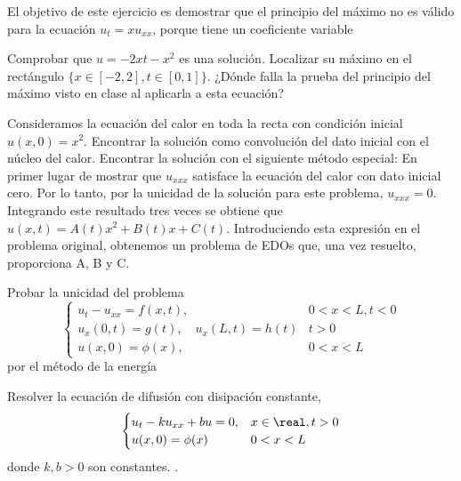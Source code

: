 \begin{problem}[13] El objetivo de este ejercicio es demostrar que el principio del máximo no es válido para la ecuación $ u_t=xu_{xx} $, porque tiene un coeficiente variable
	
\ppart Comprobar que $ u = -2xt - x^2 $ es una solución. Localizar su máximo en el rectángulo $ \{ x\in [-2,2], t\in [0,1] \} $.
\ppart ¿Dónde falla la prueba del principio del máximo visto en clase al aplicarla a esta ecuación?
	


\solution

\end{problem}





\begin{problem}[14] Consideramos la ecuación del calor en toda la recta con condición inicial $ u(x,0)=x^2 $.
\ppart Encontrar la solución como convolución del dato inicial con el núcleo del calor.
\ppart Encontrar la solución con el siguiente método especial: En primer lugar de mostrar que $ u_{xxx} $ satisface la ecuación del calor con dato inicial cero. Por lo tanto, por la unicidad de la solución para este problema, $ u_{xxx}=0 $. Integrando este resultado tres veces se obtiene que $ u(x,t)=A(t)x^2+B(t)x+C(t)$. Introduciendo esta expresión en el problema original, obtenemos un problema de EDOs que, una vez resuelto, proporciona A, B y C.

\solution

\end{problem}





\begin{problem}[15] Probar la unicidad del problema 
\[ \begin{cases}
u_t - u_{xx} = f(x,t),               & 0<x<L, t<0 \\
u_x(0,t)= g(t), \quad u_x(L,t)=h(t)  & t>0 \\
u(x,0)=\phi(x),                      & 0<x<L
\end{cases} \]
por el método de la energía

\solution

\end{problem}





\begin{problem}[16] Resolver la ecuación de difusión con disipación constante,
\[ \begin{cases}
u_t-ku_{xx}+bu=0,    & x\in \real, t>0 \\
u(x,0)=\phi(x)       & 0<x<L
\end{cases} \]
donde $ k,b>0 $ son constantes. .

\solution

\end{problem}





